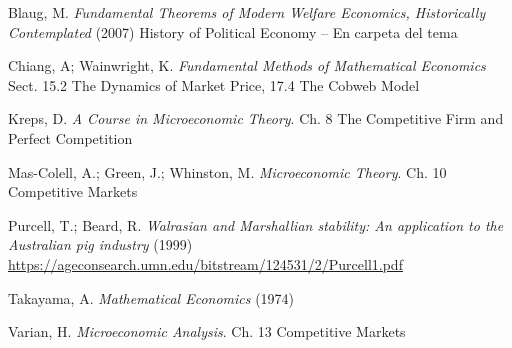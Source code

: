 \documentclass{nuevotema}
\begin{document}
Blaug, M. \textit{Fundamental Theorems of Modern Welfare Economics, Historically Contemplated} (2007) History of Political Economy -- En carpeta del tema

Chiang, A; Wainwright, K. \textit{Fundamental Methods of Mathematical Economics} Sect. 15.2 The Dynamics of Market Price, 17.4 The Cobweb Model

Kreps, D. \textit{A Course in Microeconomic Theory}. Ch. 8 The Competitive Firm and Perfect Competition

Mas-Colell, A.; Green, J.; Whinston, M. \textit{Microeconomic Theory}. Ch. 10 Competitive Markets

Purcell, T.; Beard, R. \textit{Walrasian and Marshallian stability: An application to the Australian pig industry} (1999) \url{https://ageconsearch.umn.edu/bitstream/124531/2/Purcell1.pdf}

Takayama, A. \textit{Mathematical Economics} (1974)

Varian, H. \textit{Microeconomic Analysis}. Ch. 13 Competitive Markets
\end{document}

